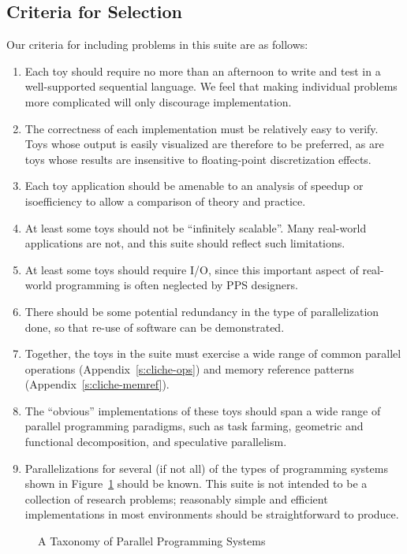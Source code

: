 \subsection{Criteria for Selection\label{s:method-criteria}}

Our criteria for including problems in this suite are as follows:
\begin{enumerate}
\item	Each toy should require no more than an afternoon
	to write and test in a well-supported sequential language.
	We feel that making individual problems more complicated will only discourage implementation.
\item	The correctness of each implementation must be relatively easy to verify.
	Toys whose output is easily visualized are therefore to be preferred,
	as are toys whose results are insensitive to floating-point discretization effects.
\item	Each toy application should be amenable to
	an analysis of speedup or isoefficiency \cite{b:isoefficiency-tutorial}
	to allow a comparison of theory and practice.
\item	At least some toys should not be ``infinitely scalable''.
	Many real-world applications are not,
	and this suite should reflect such limitations.
\item	At least some toys should require I/O,
	since this important aspect of real-world programming is often neglected by PPS designers.
\item	There should be some potential redundancy in the type of parallelization done,
	so that re-use of software can be demonstrated.
\item	Together,
	the toys in the suite must exercise a wide range of common parallel operations
	(Appendix~\ref{s:cliche-ops})
	and memory reference patterns
	(Appendix~\ref{s:cliche-memref}).
\item	The ``obvious'' implementations of these toys should span
	a wide range of parallel programming paradigms,
	such as task farming,
	geometric and functional decomposition,
	and speculative parallelism.
\item	Parallelizations for several (if not all) of
	the types of programming systems shown in Figure~\ref{f:taxonomy} should be known.
	This suite is not intended to be a collection of research problems;
	reasonably simple and efficient implementations in most environments
	should be straightforward to produce.
\end{enumerate}

\begin{figure}
\textheight
\begin{center}\mbox{}\end{center}
\caption{A Taxonomy of Parallel Programming Systems\label{f:taxonomy}}
\end{figure}


